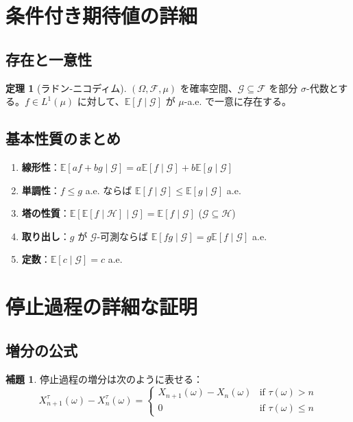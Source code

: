 \documentclass[12pt,a4paper]{article}
\theoremstyle{definition}
\newtheorem{theorem}[definition]{定理}
\newtheorem{lemma}[definition]{補題}
\newcommand{\E}{\mathbb{E}}
\newcommand{\cF}{\mathcal{F}}
\begin{document}
\appendix

\section{条件付き期待値の詳細}

\subsection{存在と一意性}

\begin{theorem}[ラドン-ニコディム]
$(\Omega, \cF, \mu)$ を確率空間、$\mathcal{G} \subseteq \cF$ を部分 $\sigma$-代数とする。$f \in L^1(\mu)$ に対して、$\E[f \mid \mathcal{G}]$ が $\mu$-a.e. で一意に存在する。
\end{theorem}

\subsection{基本性質のまとめ}

\begin{enumerate}
\item \textbf{線形性}：$\E[af + bg \mid \mathcal{G}] = a\E[f \mid \mathcal{G}] + b\E[g \mid \mathcal{G}]$
\item \textbf{単調性}：$f \leq g$ a.e. ならば $\E[f \mid \mathcal{G}] \leq \E[g \mid \mathcal{G}]$ a.e.
\item \textbf{塔の性質}：$\E[\E[f \mid \mathcal{H}] \mid \mathcal{G}] = \E[f \mid \mathcal{G}]$ ($\mathcal{G} \subseteq \mathcal{H}$)
\item \textbf{取り出し}：$g$ が $\mathcal{G}$-可測ならば $\E[fg \mid \mathcal{G}] = g\E[f \mid \mathcal{G}]$ a.e.
\item \textbf{定数}：$\E[c \mid \mathcal{G}] = c$ a.e.
\end{enumerate}

\section{停止過程の詳細な証明}

\subsection{増分の公式}

\begin{lemma}
停止過程の増分は次のように表せる：
\[
X^\tau_{n+1}(\omega) - X^\tau_n(\omega) = \begin{cases}
X_{n+1}(\omega) - X_n(\omega) & \text{if } \tau(\omega) > n \\
0 & \text{if } \tau(\omega) \leq n
\end{cases}
\]
\end{lemma}
\end{document}
